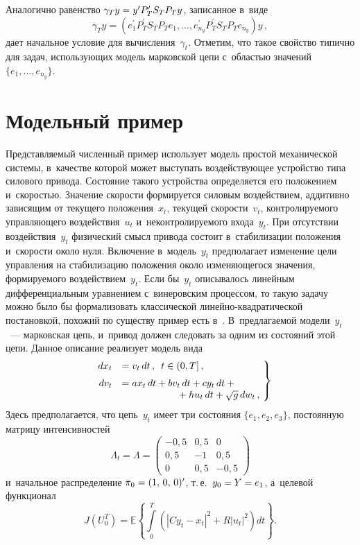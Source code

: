 \begin{multicols}{2}
Аналогично 
равенство $\gamma_T y\hm= y^\prime P_T^\prime S_T P_T y$, записанное 
в~виде 
$$
\gamma_T y = \left( e^\prime_1 P_T^\prime S_T P_T e_1,\ldots , 
e^\prime_{n_y} P_T^\prime S_T P_T e_{n_y}\right) y\,,
$$
 дает начальное условие 
для вычисления~$\gamma_t$. Отметим, что такое свойство типично для 
задач, ис\-поль\-зу\-ющих модель марковской цепи  
с~об\-ластью значений $\{e_1, \ldots , e_{n_y}\}$.

\section{Модельный пример}

     Представляемый численный пример использует модель простой 
механической системы, в~качестве которой может выступать 
воздействующее устройство типа силового привода. Состояние такого 
устройства определяется его положением и~ско\-ростью. Значение ско\-рости 
формируется силовым воздействием, аддитивно зависящим от текущего 
положения~$x_t$, текущей ско\-рости~$v_t$, контролируемого управ\-ля\-юще\-го 
воздействия~$u_t$ и~неконтролируемого входа~$y_t$. При отсутствии 
воздействия~$y_t$ физический смысл привода состоит в~стабилизации 
положения и~скорости около нуля. Включение в~модель~$y_t$ предполагает 
изменение цели управления на стабилизацию положения около 
изменяющегося значения, формируемого воздействием~$y_t$. Если бы~$y_t$ 
описывалось линейным дифференциальным уравнением с~винеровским 
процессом, то такую задачу можно было бы формализовать классической  
ли\-ней\-но-квад\-ра\-ти\-че\-ской постановкой, похожий по существу пример 
есть в~\cite{12-bos}. В~предлагаемой модели~$y_t$~--- марковская цепь, 
и~привод должен следовать за одним из состояний этой цепи. Данное 
описание реализует модель вида
     \begin{equation}
     \left.
     \begin{array}{rl}
 dx_t&=v_t \,dt\,,\enskip t\in (0,T]\,,\\[6pt]
 dv_t&= ax_t \,dt+ bv_t \,dt+ cy_t\, dt+{}\\
 &\hspace*{20mm}{}+ hu_t \,dt+\displaystyle \sqrt{g}\,dw_t\,,
     \end{array}
\!     \right\}\!\!
     \label{e19-bos}
     \end{equation}
     Здесь предполагается, что цепь~$y_t$ имеет три состояния $\{e_1, e_2, 
e_3\}$, постоянную матрицу интенсивностей 
$$
\Lambda_t= \Lambda= 
\begin{pmatrix}
     -0{,}5 & 0{,}5 & 0\\
     0{,}5 & -1 & 0{,}5\\
     0& 0{,}5 & -0{,}5
     \end{pmatrix}
     $$ 
     и~начальное распределение $\pi_0\hm= (1,\, 0,\, 0)^\prime$, т.\,е.\ 
$y_0\hm= Y\hm= e_1$, а~целевой функционал
     \begin{equation}
     J\left( U_0^T\right) =\mathbb{E}\left\{ \int\limits_0^T \left( \left\vert Cy_t-
x_t\right\vert^2 +R\left\vert u_t\right\vert^2\right)dt\right\}.
     \label{e20-bos}
\end{equation}
     

\end{multicols}
